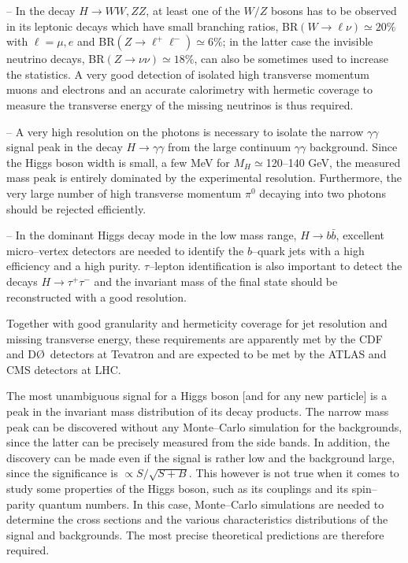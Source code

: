 -- In the decay $H\to WW, ZZ$, at least one of the $W/Z$ bosons has to be
observed in its leptonic decays which have small branching ratios, BR$(W
\to \ell \nu) \simeq 20\%$ with $\ell =\mu,e$ and BR$(Z \to \ell^+ \ell^-)
\simeq 6\%$; in the latter case the invisible neutrino decays, BR$(Z \to \nu
\nu) \simeq 18\%$, can also be sometimes used to increase the statistics. A
very good detection of isolated high transverse momentum muons and electrons
and an accurate calorimetry with hermetic coverage to measure the transverse
energy of the missing neutrinos is thus required. \s

-- A very high resolution on the photons is necessary to isolate the narrow 
$\gamma \gamma$ signal peak in the decay $H\to \gamma \gamma$ from the large
continuum $\gamma \gamma$ background.  Since the Higgs boson width is small, a
few MeV for $M_H\simeq$120--140 GeV, the measured mass peak is entirely 
dominated by the experimental resolution.  Furthermore, the very large number 
of high transverse momentum $\pi^0$ decaying into two photons should be 
rejected efficiently. \s

-- In the dominant Higgs decay mode in the low mass range, $H\to b \bar b$,
excellent micro--vertex detectors are needed to identify the $b$--quark jets
with a high efficiency and a high purity. $\tau$--lepton identification is also
important to detect the decays $H\to \tau^+ \tau^-$ and the invariant mass of
the final state should be reconstructed with a good resolution. \s

Together with good granularity and hermeticity coverage for jet resolution and 
missing transverse energy, these requirements are apparently met by the CDF 
and D\O\ detectors at Tevatron \cite{Higgs-TeV} and are expected to be met 
by the ATLAS and CMS detectors at LHC.\s

The most unambiguous signal for a Higgs boson [and for any new particle] is a
peak in the invariant mass distribution of its decay products. The narrow mass
peak can be discovered without any Monte--Carlo simulation for the backgrounds,
since the latter can be precisely measured from the side bands. In addition,
the discovery can be made even if the signal is rather low and the background
large, since the significance is $\propto S/\sqrt{S+B}$. This however is not
true when it comes to study some properties of the Higgs boson, such as its
couplings and its spin--parity quantum numbers. In this case, Monte--Carlo
simulations are needed to determine the cross sections and the various
characteristics distributions of the signal and backgrounds. The most precise 
theoretical predictions are therefore required.  

